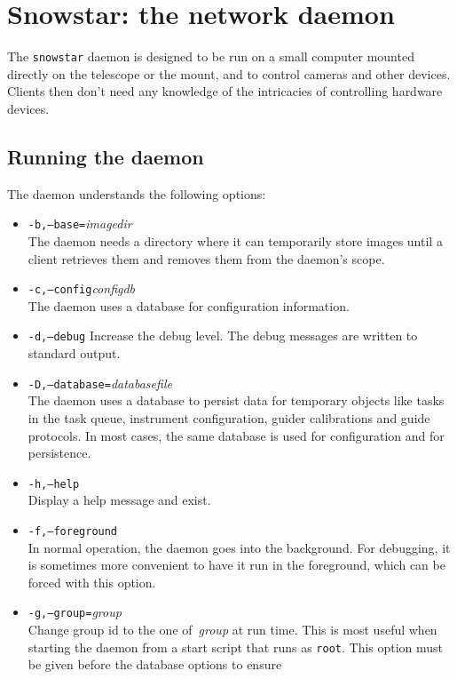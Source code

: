 %
%
%
\chapter{Snowstar: the network daemon\label{chapter:snowstar}}
The \texttt{snowstar} daemon is designed to be run on a small
computer mounted directly on the telescope or the mount, and to
control cameras and other devices.
Clients then don't need any knowledge of the intricacies of controlling
hardware devices.

\section{Running the daemon}
The daemon understands the following options:
\begin{itemize}
\item
\texttt{-b,--base=}\textit{imagedir}
\\
The daemon needs a directory where it can temporarily store images until
a client retrieves them and removes them from the daemon's scope.
\item
\texttt{-c,--config}\textit{configdb}
\\
The daemon uses a database for configuration information.
\item
\texttt{-d,--debug}
Increase the debug level.
The debug messages are written to standard output.
\item
\texttt{-D,--database=}\textit{databasefile}
\\
The daemon uses a database to persist data for temporary objects
like tasks in the task queue, instrument configuration, guider
calibrations and guide protocols.
In most cases, the same database is used for configuration and
for persistence.
\item
\texttt{-h,--help}
\\
Display a help message and exist.
\item
\texttt{-f,--foreground}
\\
In normal operation, the daemon goes into the background.
For debugging, it is sometimes more convenient to have it run in the
foreground, which can be forced with this option.
\item
\texttt{-g,--group=}\textit{group}
\\
Change group id to the one of~\textit{group} at run time.
This is most useful when starting the daemon from a start script
that runs as \texttt{root}.
This option must be given before the database options to ensure

\end{itemize}
